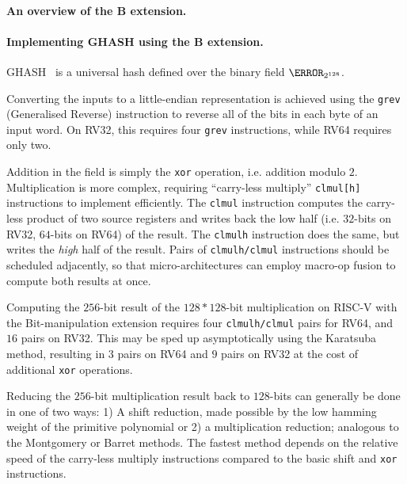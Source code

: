 
\paragraph{An overview of           the B extension.}



\paragraph{Implementing GHASH using the B extension.}

GHASH~\cite[Section 6.4]{NIST:sp.800.38d} is a universal hash defined over the binary field $\F_{2^{128}}$.

Converting the inputs to a little-endian representation is achieved
using the 
{\tt grev} (Generalised Reverse)
instruction to reverse all of the bits in each byte
of an input word.
On RV32, this requires four {\tt grev} instructions, while RV64 requires
only two.

Addition in the field is simply the {\tt xor} operation, i.e. addition
modulo $2$.
Multiplication is more complex, requiring ``carry-less multiply''
{\tt clmul[h]} instructions to implement efficiently.
The {\tt clmul} instruction computes the carry-less product of two source
registers and writes back the low half
(i.e. $32$-bits on RV32, $64$-bits on RV64)
of the result.
The {\tt clmulh} instruction does the same, but writes the {\em high}
half of the result.
Pairs of {\tt clmulh/clmul} instructions
should be scheduled adjacently, so that micro-architectures can employ
macro-op fusion to compute both results at once.

Computing the $256$-bit result of the $128*128$-bit multiplication
on RISC-V with the Bit-manipulation extension requires
four {\tt clmulh/clmul} pairs for RV64,
and $16$ pairs on RV32.
This may be sped up asymptotically using the Karatsuba method,
resulting in $3$ pairs on RV64 and $9$ pairs on RV32
at the cost of additional {\tt xor} operations.

Reducing the $256$-bit multiplication result back to $128$-bits
can generally be done in one of two ways:
1) A shift reduction, made possible by the low hamming weight of
the primitive polynomial
or
2) a multiplication reduction; analogous to the Montgomery or
Barret methods.
The fastest method depends on the relative speed of
the carry-less multiply instructions compared to the basic
shift and {\tt xor} instructions.

